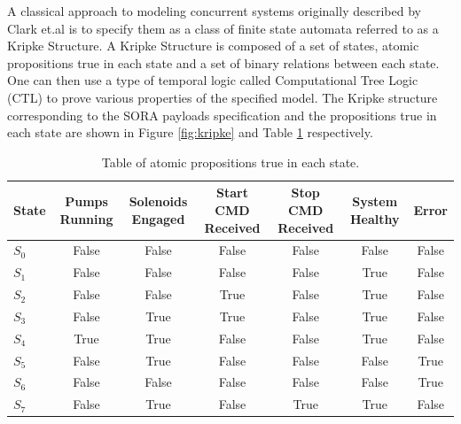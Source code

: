 \documentclass{article}
\begin{document}
A classical approach to modeling concurrent systems originally described by Clark et.al \cite{clark} is to specify them as a class of finite state automata referred to as a Kripke Structure. A Kripke Structure is composed of a set of states, atomic propositions true in each state and a set of binary relations between each state. One can then use a type of temporal logic called Computational Tree Logic (CTL) to prove various properties of the specified model. The Kripke structure corresponding to the SORA payloads specification and the propositions true in each state are shown in Figure \ref{fig:kripke} and  Table \ref{table:propositions} respectively. 

\begin{table}[H]
\begin{tabular}{ |l|c|c|c|c|c|c| }
\hline
 State & Pumps Running & Solenoids Engaged & Start CMD Received & Stop CMD Received & System Healthy&Error\\
\hline
$S_0$  & False & False & False & False & False& False \\ 
$S_1$  & False & False & False & False & True& False \\
$S_2$  & False & False & True & False & True& False \\
$S_3$  & False & True & True & False & True & False \\
$S_4$  & True & True & False & False & True & False \\
$S_5$  & False & True & False & False & False& True \\
$S_6$  & False & False & False & False & False& True \\
$S_7$  & False & True & False & True & True& False \\
 \hline
\end{tabular}
\caption{Table of atomic propositions true in each state.}
\label{table:propositions}

\end{table}
\end{document}
